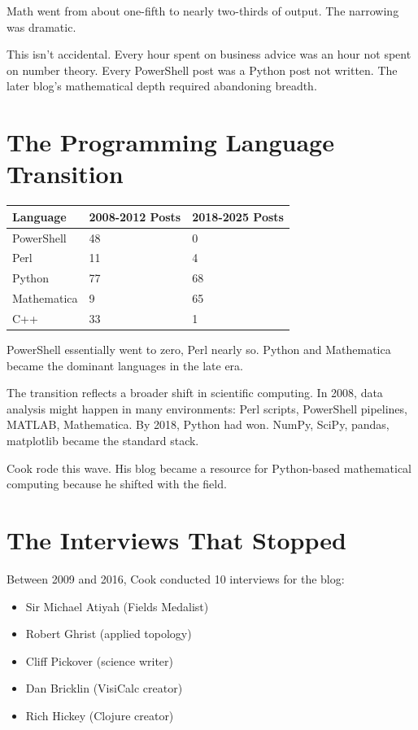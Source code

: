 Math went from about one-fifth to nearly two-thirds of output. The narrowing was dramatic.

This isn't accidental. Every hour spent on business advice was an hour not spent on number theory. Every PowerShell post was a Python post not written. The later blog's mathematical depth required abandoning breadth.

\bigskip

\section*{The Programming Language Transition}

\begin{longtable}{p{3.00cm}p{3.00cm}p{3.00cm}}
\toprule
\textbf{Language} & \textbf{2008-2012 Posts} & \textbf{2018-2025 Posts} \tabularnewline
\midrule
PowerShell & 48 & 0 \tabularnewline
Perl & 11 & 4 \tabularnewline
Python & 77 & 68 \tabularnewline
Mathematica & 9 & 65 \tabularnewline
C++ & 33 & 1 \tabularnewline
\bottomrule
\end{longtable}

PowerShell essentially went to zero, Perl nearly so. Python and Mathematica became the dominant languages in the late era.

The transition reflects a broader shift in scientific computing. In 2008, data analysis might happen in many environments: Perl scripts, PowerShell pipelines, MATLAB, Mathematica. By 2018, Python had won. NumPy, SciPy, pandas, matplotlib became the standard stack.

Cook rode this wave. His blog became a resource for Python-based mathematical computing because he shifted with the field.

\bigskip

\section*{The Interviews That Stopped}

Between 2009 and 2016, Cook conducted 10 interviews for the blog:

\begin{itemize}
\item Sir Michael Atiyah (Fields Medalist)
\item Robert Ghrist (applied topology)
\item Cliff Pickover (science writer)
\item Dan Bricklin (VisiCalc creator)
\item Rich Hickey (Clojure creator)
\end{itemize}

